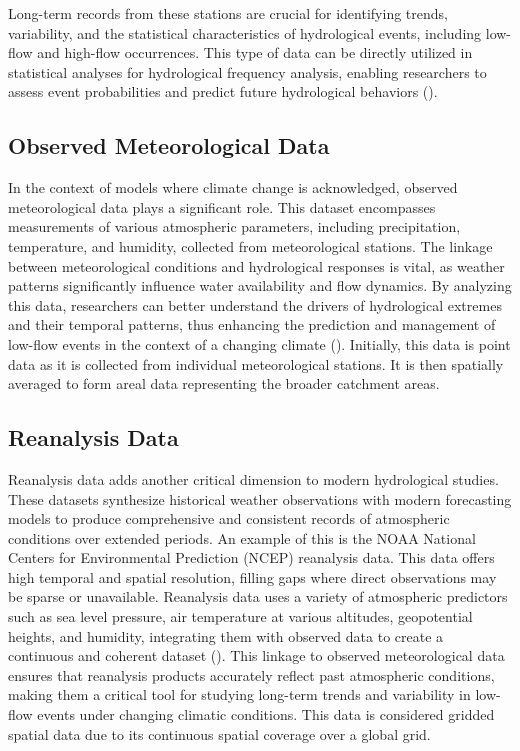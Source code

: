 \documentclass[
]{krantz}
\begin{document}
Long-term records from these stations are crucial for identifying trends, variability, and the statistical characteristics of hydrological events, including low-flow and high-flow occurrences. This type of data can be directly utilized in statistical analyses for hydrological frequency analysis, enabling researchers to assess event probabilities and predict future hydrological behaviors (\citet{Helsel2002}).

\subsection{Observed Meteorological Data}\label{observed-meteorological-data}

In the context of models where climate change is acknowledged, observed meteorological data plays a significant role. This dataset encompasses measurements of various atmospheric parameters, including precipitation, temperature, and humidity, collected from meteorological stations. The linkage between meteorological conditions and hydrological responses is vital, as weather patterns significantly influence water availability and flow dynamics. By analyzing this data, researchers can better understand the drivers of hydrological extremes and their temporal patterns, thus enhancing the prediction and management of low-flow events in the context of a changing climate (\citet{Huntington2006}). Initially, this data is point data as it is collected from individual meteorological stations. It is then spatially averaged to form areal data representing the broader catchment areas.

\subsection{Reanalysis Data}\label{reanalysis-data}

Reanalysis data adds another critical dimension to modern hydrological studies. These datasets synthesize historical weather observations with modern forecasting models to produce comprehensive and consistent records of atmospheric conditions over extended periods. An example of this is the NOAA National Centers for Environmental Prediction (NCEP) reanalysis data. This data offers high temporal and spatial resolution, filling gaps where direct observations may be sparse or unavailable. Reanalysis data uses a variety of atmospheric predictors such as sea level pressure, air temperature at various altitudes, geopotential heights, and humidity, integrating them with observed data to create a continuous and coherent dataset (\citet{Kalnay1996}). This linkage to observed meteorological data ensures that reanalysis products accurately reflect past atmospheric conditions, making them a critical tool for studying long-term trends and variability in low-flow events under changing climatic conditions. This data is considered gridded spatial data due to its continuous spatial coverage over a global grid.
\end{document}
